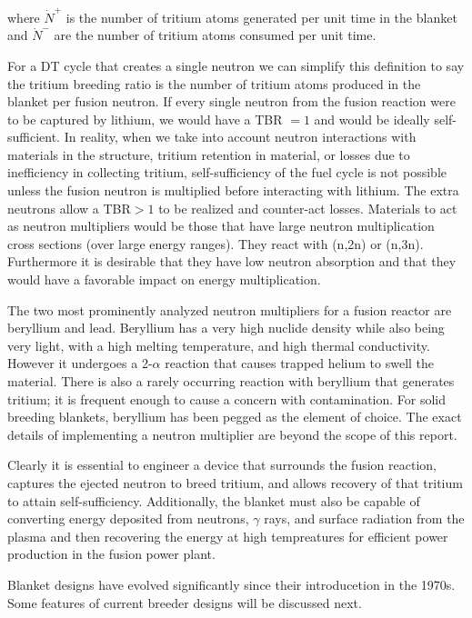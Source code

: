 where $\dot{N}^+$ is the number of tritium atoms generated per unit time in the blanket and $\dot{N}^-$ are the number of tritium atoms consumed per unit time.

For a DT cycle that creates a single neutron we can simplify this definition to say the tritium breeding ratio is the number of tritium atoms produced in the blanket per fusion neutron. If every single neutron from the fusion reaction were to be captured by lithium, we would have a TBR $=1$ and would be ideally self-sufficient. In reality, when we take into account neutron interactions with materials in the structure, tritium retention in material, or losses due to inefficiency in collecting tritium, self-sufficiency of the fuel cycle is not possible unless the fusion neutron is multiplied before interacting with lithium. The extra neutrons allow a TBR$>1$ to be realized and counter-act losses. Materials to act as neutron multipliers would be those that have large neutron multiplication cross sections (over large energy ranges). They react with (n,2n) or (n,3n). Furthermore it is desirable that they have low neutron absorption and that they would have a favorable impact on energy multiplication. 

The two most prominently analyzed neutron multipliers for a fusion reactor are beryllium and lead. Beryllium has a very high nuclide density while also being very light, with a high melting temperature, and high thermal conductivity. However it undergoes a 2-$\alpha$ reaction that causes trapped helium to swell the material. There is also a rarely occurring reaction with beryllium that generates tritium; it is frequent enough to cause a concern with contamination. For solid breeding blankets, beryllium has been pegged as the element of choice. The exact details of implementing a neutron multiplier are beyond the scope of this report.

Clearly it is essential to engineer a device that surrounds the fusion reaction, captures the ejected neutron to breed tritium, and allows recovery of that tritium to attain self-sufficiency. Additionally, the blanket must also be capable of converting energy deposited from neutrons, $\gamma$ rays, and surface radiation from the plasma and then recovering the energy at high tempreatures for efficient power production in the fusion power plant.

Blanket designs have evolved significantly since their introducetion in the 1970s. Some features of current breeder designs will be discussed next.



